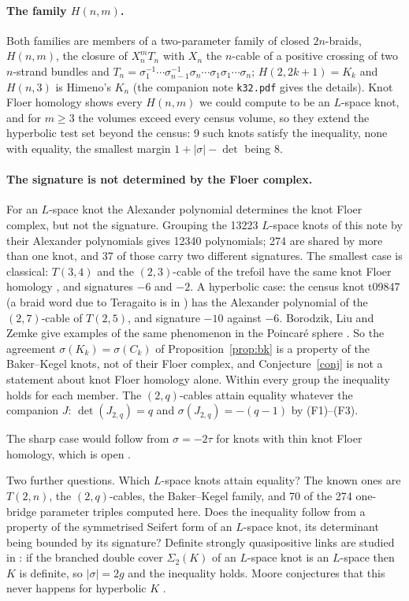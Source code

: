 \documentclass[11pt]{article}
\theoremstyle{definition}
\begin{document}
\paragraph{The family $H(n,m)$.} Both families are members of a two-parameter family of closed $2n$-braids, $H(n,m)$, the
closure of $X_n^m T_n$ with $X_n$ the $n$-cable of a positive crossing of two $n$-strand bundles and
$T_n = \sigma_1^{-1}\cdots\sigma_{n-1}^{-1}\sigma_n\cdots\sigma_1\sigma_1\cdots\sigma_n$; $H(2,2k+1) = K_k$ and $H(n,3)$ is
Himeno's $K_n$ (the companion note \texttt{k32.pdf} gives the details). Knot Floer homology shows every $H(n,m)$ we could
compute to be an $L$-space knot, and for $m \ge 3$ the volumes exceed every census volume, so they extend the
hyperbolic test set beyond the census: 9 such knots satisfy the inequality, none with equality, the smallest margin
$1 + |\sigma| - \det$ being 8.

\paragraph{The signature is not determined by the Floer complex.} For an $L$-space knot the Alexander polynomial
determines the knot Floer complex, but not the signature. Grouping the 13223 $L$-space knots of this note by their
Alexander polynomials gives 12340 polynomials; 274 are shared by more than one knot, and 37 of
those carry two different signatures. The smallest case is classical: $T(3,4)$ and the $(2,3)$-cable of the trefoil have
the same knot Floer homology \cite[\S 1.1.3]{Hedden}, and signatures $-6$ and $-2$. A hyperbolic case: the census knot
t09847 (a braid word due to Teragaito is in \cite[Remark 4.2]{BK}) has the Alexander polynomial of the $(2,7)$-cable of
$T(2,5)$, and signature $-10$ against $-6$. Borodzik, Liu and Zemke give examples of the same phenomenon in the
Poincar\'e sphere \cite[Proposition 3.20, Remark 3.21]{BLZ}. So the agreement
$\sigma(K_k) = \sigma(C_k)$ of Proposition~\ref{prop:bk} is a property of the Baker--Kegel knots, not of their Floer
complex, and Conjecture~\ref{conj} is not a statement about knot Floer homology alone. Within every group the inequality
holds for each member. The $(2,q)$-cables attain equality whatever the companion $J$: $\det(J_{2,q}) = q$ and
$\sigma(J_{2,q}) = -(q-1)$ by (F1)--(F3).

The sharp case would follow from $\sigma = -2\tau$ for knots with thin knot Floer homology, which is open
\cite[\S 8.1]{HM}.

Two further questions. Which $L$-space knots attain equality? The known ones are $T(2,n)$, the $(2,q)$-cables, the
Baker--Kegel family, and 70 of the 274 one-bridge parameter triples computed here. Does the inequality follow from a property of
the symmetrised Seifert form of an $L$-space knot, its determinant being bounded by its signature? Definite strongly
quasipositive links are studied in \cite{BBG}: if the branched double cover $\Sigma_2(K)$ of an $L$-space knot is an
$L$-space then $K$ is definite, so $|\sigma| = 2g$ and the inequality holds. Moore conjectures that this never happens
for hyperbolic $K$ \cite[Problem 1.22]{K3}.
\end{document}
